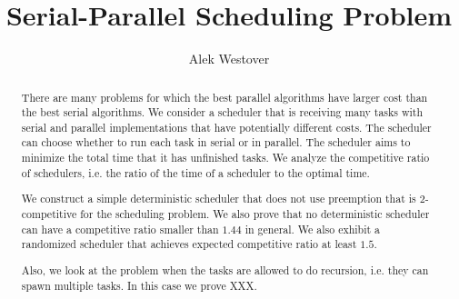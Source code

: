\documentclass[twocolumn]{article}[10pt]
\author{Alek Westover}
\title{Serial-Parallel Scheduling Problem}
\newcommand{\todo}[1]{{\color{red}\textbf{TODO:} #1}}
\begin{document}
\maketitle

\begin{abstract}
  There are many problems for which the best parallel algorithms
  have larger cost than the best serial algorithms. 
  We consider a scheduler that is receiving many tasks with
  serial and parallel implementations that have potentially
  different costs. The scheduler can choose whether to run each
  task in serial or in parallel.
  The scheduler aims to minimize the total time that it has
  unfinished tasks. We analyze the competitive ratio of
  schedulers, i.e. the ratio of the time of a scheduler to the
  optimal time.

  We construct a simple deterministic scheduler that does not use
  preemption that is $2$-competitive for the scheduling problem.
  We also prove that no deterministic scheduler can have a
  competitive ratio smaller than $1.44$ in general.
  We also exhibit a randomized scheduler that achieves
  expected competitive ratio at least $1.5$.

  Also, we look at the problem when the tasks are allowed to do
  recursion, i.e. they can spawn multiple tasks. In this case we
  prove XXX.

\end{abstract}




% 
% 




\end{document}

